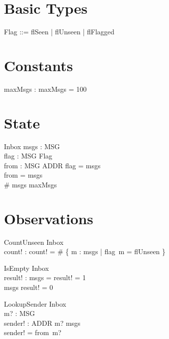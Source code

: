 \documentclass{article}
\begin{document}
\section{Basic Types}

\begin{zed}
\end{zed}

\begin{zed}
  Flag ::= flSeen | flUnseen | flFlagged
\end{zed}

\section{Constants}

\begin{axdef}
  maxMsgs : \nat
\where
  maxMsgs = 100
\end{axdef}

\section{State}

\begin{schema}{Inbox}
  msgs : \power MSG \\
  flag : MSG \pfun Flag \\
  from : MSG \pfun ADDR
\where
  \dom flag = msgs \\
  \dom from = msgs \\
  \# msgs \leq maxMsgs
\end{schema}

\section{Observations}

\begin{schema}{CountUnseen}
  \Xi Inbox \\
  count! : \nat
\where
  count! = \# \{ m : msgs | flag~m = flUnseen \}
\end{schema}

\begin{schema}{IsEmpty}
  \Xi Inbox \\
  result! : \nat
\where
  msgs = \emptyset \implies result! = 1 \\
  msgs \neq \emptyset \implies result! = 0
\end{schema}

\begin{schema}{LookupSender}
  \Xi Inbox \\
  m? : MSG \\
  sender! : ADDR
\where
  m? \in msgs \\
  sender! = from~m?
\end{schema}
\end{document}

